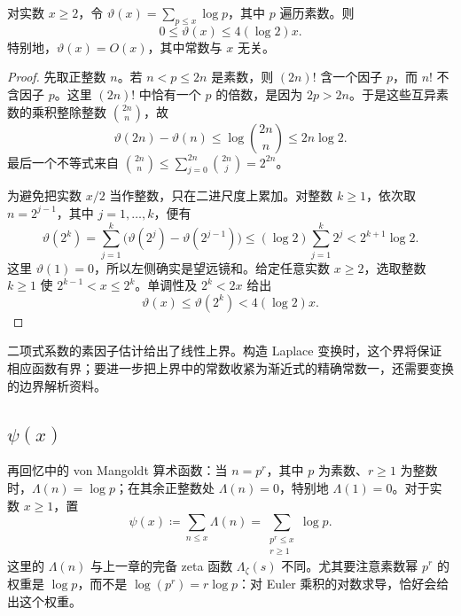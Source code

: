 \begin{lemma}[Chebyshev 上界]\label{b3:lem:27-chebyshev}
对实数 \(x\ge2\)，令 \(\vartheta(x)=\sum_{p\le x}\log p\)，其中 \(p\) 遍历素数。则
\[
 0\le\vartheta(x)\le4(\log2)x.
\]
特别地，\(\vartheta(x)=O(x)\)，其中常数与 \(x\) 无关。
\end{lemma}
\begin{proof}
先取正整数 \(n\)。若 \(n<p\le2n\) 是素数，则 \((2n)!\) 含一个因子 \(p\)，而 \(n!\) 不含因子 \(p\)。这里 \((2n)!\) 中恰有一个 \(p\) 的倍数，是因为 \(2p>2n\)。于是这些互异素数的乘积整除整数 \(\binom{2n}{n}\)，故
\[
 \vartheta(2n)-\vartheta(n)
 \le\log\binom{2n}{n}
 \le2n\log2.
\]
最后一个不等式来自 \(\binom{2n}{n}\le\sum_{j=0}^{2n}\binom{2n}{j}=2^{2n}\)。

为避免把实数 \(x/2\) 当作整数，只在二进尺度上累加。对整数 \(k\ge1\)，依次取 \(n=2^{j-1}\)，其中 \(j=1,\ldots,k\)，便有
\[
 \vartheta(2^k)
 =\sum_{j=1}^k\bigl(\vartheta(2^j)-\vartheta(2^{j-1})\bigr)
 \le(\log2)\sum_{j=1}^k2^j
 <2^{k+1}\log2.
\]
这里 \(\vartheta(1)=0\)，所以左侧确实是望远镜和。给定任意实数 \(x\ge2\)，选取整数 \(k\ge1\) 使 \(2^{k-1}<x\le2^k\)。单调性及 \(2^k<2x\) 给出
\[
 \vartheta(x)\le\vartheta(2^k)<4(\log2)x.
\]
\end{proof}

二项式系数的素因子估计给出了线性上界。构造 Laplace 变换时，这个界将保证相应函数有界；要进一步把上界中的常数收紧为渐近式的精确常数一，还需要变换的边界解析资料。

\subsection{\texorpdfstring{\(\psi(x)\)}{\AnalysisPdfPsi(x)}}
\label{b3:subsec:270103}

再回忆中的 von Mangoldt 算术函数：当 \(n=p^r\)，其中 \(p\) 为素数、\(r\ge1\) 为整数时，\(\Lambda(n)=\log p\)；在其余正整数处 \(\Lambda(n)=0\)，特别地 \(\Lambda(1)=0\)。对于实数 \(x\ge1\)，置
\[
 \psi(x)\coloneqq\sum_{n\le x}\Lambda(n)
 =\sum_{\substack{p^r\le x\\r\ge1}}\log p.
\]
这里的 \(\Lambda(n)\) 与上一章的完备 zeta 函数 \(\Lambda_\zeta(s)\) 不同。尤其要注意素数幂 \(p^r\) 的权重是 \(\log p\)，而不是 \(\log(p^r)=r\log p\)：对 Euler 乘积的对数求导，恰好会给出这个权重。

